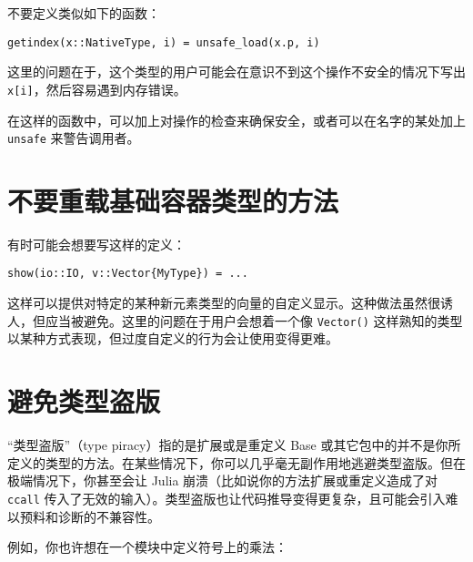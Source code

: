 不要定义类似如下的函数：




\begin{verbatim}
getindex(x::NativeType, i) = unsafe_load(x.p, i)
\end{verbatim}



这里的问题在于，这个类型的用户可能会在意识不到这个操作不安全的情况下写出 \texttt{x[i]}，然后容易遇到内存错误。



在这样的函数中，可以加上对操作的检查来确保安全，或者可以在名字的某处加上 \texttt{unsafe} 来警告调用者。



\hypertarget{11547972187147924005}{}


\section{不要重载基础容器类型的方法}



有时可能会想要写这样的定义：




\begin{verbatim}
show(io::IO, v::Vector{MyType}) = ...
\end{verbatim}



这样可以提供对特定的某种新元素类型的向量的自定义显示。这种做法虽然很诱人，但应当被避免。这里的问题在于用户会想着一个像 \texttt{Vector()} 这样熟知的类型以某种方式表现，但过度自定义的行为会让使用变得更难。



\hypertarget{16979726342714314714}{}


\section{避免类型盗版}



“类型盗版”（type piracy）指的是扩展或是重定义 Base 或其它包中的并不是你所定义的类型的方法。在某些情况下，你可以几乎毫无副作用地逃避类型盗版。但在极端情况下，你甚至会让 Julia 崩溃（比如说你的方法扩展或重定义造成了对 \texttt{ccall} 传入了无效的输入）。类型盗版也让代码推导变得更复杂，且可能会引入难以预料和诊断的不兼容性。



例如，你也许想在一个模块中定义符号上的乘法：




